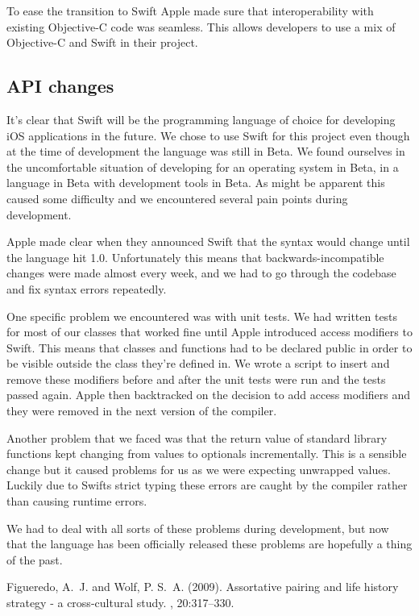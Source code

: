 \documentclass[DIV=calc, paper=a4, fontsize=11pt, twocolumn]{scrartcl}	 %
\begin{document}
To ease the transition to Swift Apple made sure that interoperability with existing Objective-C 
code was seamless. This allows developers to use a mix of Objective-C and Swift in their project.

\subsection*{API changes}

It's clear that Swift will be the programming language of choice for developing iOS applications
in the future. We chose to use Swift for this project even though at the time of development the
language was still in Beta. We found ourselves in the uncomfortable situation of developing for an
operating system in Beta, in a language in Beta with development tools in Beta. As might be apparent
this caused some difficulty and we encountered several pain points during development.

Apple made clear when they announced Swift that the syntax would change until the language hit 1.0.
Unfortunately this means that backwards-incompatible changes were made almost every week, and we had
to go through the codebase and fix syntax errors repeatedly.

One specific problem we encountered was with unit tests. We had written tests for most of our classes
that worked fine until Apple introduced access modifiers to Swift. This means that classes and 
functions had to be declared public in order to be visible outside the class they're defined in. We
wrote a script to insert and remove these modifiers before and after the unit tests were run and
the tests passed again. Apple then backtracked on the decision to add access modifiers and they were
removed in the next version of the compiler. 

Another problem that we faced was that the return value of standard library functions kept changing
from values to optionals incrementally. This is a sensible change but it caused problems for us as
we were expecting unwrapped values. Luckily due to Swifts strict typing these errors are caught by
the compiler rather than causing runtime errors.

We had to deal with all sorts of these problems during development, but now that the language has 
been officially released these problems are hopefully a thing of the past.



\begin{thebibliography}{99} %

Figueredo, A.~J. and Wolf, P. S.~A. (2009).
\newblock Assortative pairing and life history strategy - a cross-cultural
  study.
, 20:317--330.
 
\end{thebibliography}

\end{document}
